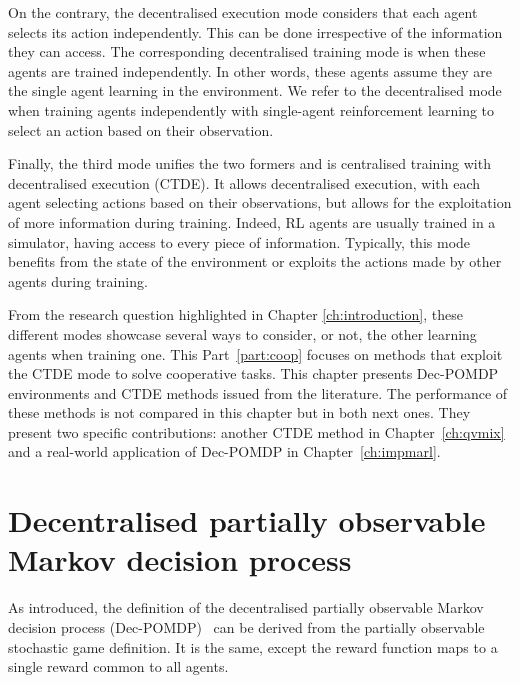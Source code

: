 On the contrary, the decentralised execution mode considers that each agent selects its action independently.
This can be done irrespective of the information they can access.
The corresponding decentralised training mode is when these agents are trained independently.
In other words, these agents assume they are the single agent learning in the environment.
We refer to the decentralised mode when training agents independently with single-agent reinforcement learning to select an action based on their observation.

Finally, the third mode unifies the two formers and is centralised training with decentralised execution (CTDE).
It allows decentralised execution, with each agent selecting actions based on their observations, but allows for the exploitation of more information during training.
Indeed, RL agents are usually trained in a simulator, having access to every piece of information.
Typically, this mode benefits from the state of the environment or exploits the actions made by other agents during training.

From the research question highlighted in Chapter \ref{ch:introduction}, these different modes showcase several ways to consider, or not, the other learning agents when training one.
This Part~\ref{part:coop} focuses on methods that exploit the CTDE mode to solve cooperative tasks.
This chapter presents Dec-POMDP environments and CTDE methods issued from the literature.
The performance of these methods is not compared in this chapter but in both next ones.
They present two specific contributions: another CTDE method in Chapter~\ref{ch:qvmix} and a real-world application of Dec-POMDP in Chapter~\ref{ch:impmarl}.

\section{Decentralised partially observable Markov decision process}
\label{sec:ch3_decpomdp}
As introduced, the definition of the decentralised partially observable Markov decision process (Dec-POMDP)~\citep{DecPomdp} can be derived from the partially observable stochastic game definition.
It is the same, except the reward function maps to a single reward common to all agents.

